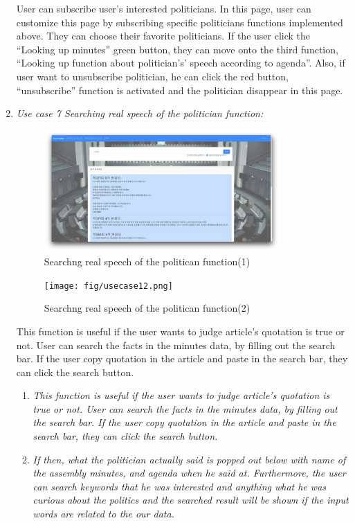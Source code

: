 \documentclass[conference]{IEEEtran}
\begin{document}
\begin{enumerate}
 User can subscribe user’s interested politicians. In this page, user can customize this page by subscribing specific politicians functions implemented above. They can choose their favorite politicians. If the user click the “Looking up minutes” green button,  they can move onto the third function, “Looking up  function about politician’s' speech according to agenda”. Also, if user want to unsubscribe politician, he can click the red button, “unsubscribe” function is activated and the politician disappear in this page.\\


 \item \textit{Use case 7 Searching real speech of the politician function:} 
 
 \begin{figure}[htbp]
\centerline{\includegraphics[width=90mm,scale=0.5]{fig/usecase11.png}}
\caption{Searchng real speech of the politican function(1)}
\label{fig}
\end{figure}
  \begin{figure}[htbp]
\centerline{\texttt{[image: fig/usecase12.png]}}
\caption{Searchng real speech of the politican function(2)}
\label{fig}
\end{figure}
 
 This function is useful if the user wants to judge article’s quotation is true or not. User can search the facts in the minutes data, by filling out the search bar. If the user copy quotation in the article and paste in the search bar, they can click the search button. \
 
 
 \begin{enumerate}
    \item\textit{This function is useful if the user wants to judge article’s quotation is true or not. User can search the facts in the minutes data, by filling out the search bar. If the user copy quotation in the article and paste in the search bar, they can click the search button.} \\
    \item \textit{ If then, what the politician actually said is popped out below with name of the assembly minutes, and agenda when he said at. Furthermore, the user can search keywords that he was interested and anything what he was curious about the politics and the searched result will be shown if the input words are related to the our data.} \\
\end{enumerate}

\end{enumerate}
 
\end{document}
